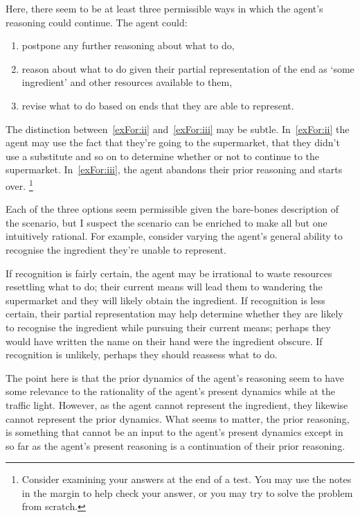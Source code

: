 \documentclass[10pt]{article}
\begin{document}
Here, there seem to be at least three permissible ways in which the agent's reasoning could continue.
The agent could:
\begin{enumerate}[label=\roman*)]
\item\label{exFor:i} postpone any further reasoning about what to do,
\item\label{exFor:ii} reason about what to do given their partial representation of the end as `some ingredient' and other resources available to them,
\item\label{exFor:iii} revise what to do based on ends that they are able to represent.
\end{enumerate}
The distinction between~\ref{exFor:ii} and~\ref{exFor:iii} may be subtle.
In~\ref{exFor:ii} the agent may use the fact that they're going to the supermarket, that they didn't use a substitute and so on to determine whether or not to continue to the supermarket.
In~\ref{exFor:iii}, the agent abandons their prior reasoning and starts over.\nolinebreak
\footnote{Consider examining your answers at the end of a test.
You may use the notes in the margin to help check your answer, or you may try to solve the problem from scratch.}

Each of the three options seem permissible given the bare-bones description of the scenario, but I suspect the scenario can be enriched to make all but one intuitively rational.
For example, consider varying the agent's general ability to recognise the ingredient they're unable to represent.

If recognition is fairly certain, the agent may be irrational to waste resources resettling what to do; their current means will lead them to wandering the supermarket and they will likely obtain the ingredient.
If recognition is less certain, their partial representation may help determine whether they are likely to recognise the ingredient while pursuing their current means; perhaps they would have written the name on their hand were the ingredient obscure.
If recognition is unlikely, perhaps they should reassess what to do.

The point here is that the prior dynamics of the agent's reasoning seem to have some relevance to the rationality of the agent's present dynamics while at the traffic light.
However, as the agent cannot represent the ingredient, they likewise cannot represent the prior dynamics.
What seems to matter, the prior reasoning, is something that cannot be an input to the agent's present dynamics except in so far as the agent's present reasoning is a continuation of their prior reasoning.
\end{document}
